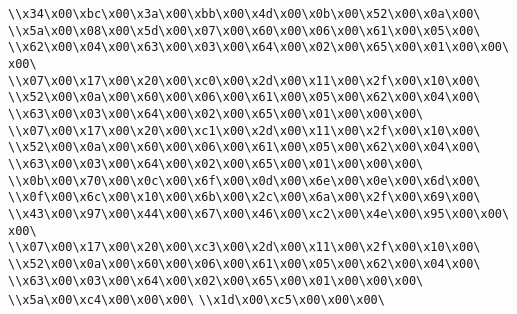 \verb|\\x34\x00\xbc\x00\x3a\x00\xbb\x00\x4d\x00\x0b\x00\x52\x00\x0a\x00\|\newline
\verb|\\x5a\x00\x08\x00\x5d\x00\x07\x00\x60\x00\x06\x00\x61\x00\x05\x00\|\newline
\verb|\\x62\x00\x04\x00\x63\x00\x03\x00\x64\x00\x02\x00\x65\x00\x01\x00\x00\x00\|\newline
\verb|\\x07\x00\x17\x00\x20\x00\xc0\x00\x2d\x00\x11\x00\x2f\x00\x10\x00\|\newline
\verb|\\x52\x00\x0a\x00\x60\x00\x06\x00\x61\x00\x05\x00\x62\x00\x04\x00\|\newline
\verb|\\x63\x00\x03\x00\x64\x00\x02\x00\x65\x00\x01\x00\x00\x00\|\newline
\verb|\\x07\x00\x17\x00\x20\x00\xc1\x00\x2d\x00\x11\x00\x2f\x00\x10\x00\|\newline
\verb|\\x52\x00\x0a\x00\x60\x00\x06\x00\x61\x00\x05\x00\x62\x00\x04\x00\|\newline
\verb|\\x63\x00\x03\x00\x64\x00\x02\x00\x65\x00\x01\x00\x00\x00\|\newline
\verb|\\x0b\x00\x70\x00\x0c\x00\x6f\x00\x0d\x00\x6e\x00\x0e\x00\x6d\x00\|\newline
\verb|\\x0f\x00\x6c\x00\x10\x00\x6b\x00\x2c\x00\x6a\x00\x2f\x00\x69\x00\|\newline
\verb|\\x43\x00\x97\x00\x44\x00\x67\x00\x46\x00\xc2\x00\x4e\x00\x95\x00\x00\x00\|\newline
\verb|\\x07\x00\x17\x00\x20\x00\xc3\x00\x2d\x00\x11\x00\x2f\x00\x10\x00\|\newline
\verb|\\x52\x00\x0a\x00\x60\x00\x06\x00\x61\x00\x05\x00\x62\x00\x04\x00\|\newline
\verb|\\x63\x00\x03\x00\x64\x00\x02\x00\x65\x00\x01\x00\x00\x00\|\newline
\verb|\\x5a\x00\xc4\x00\x00\x00\|\newline
\verb|\\x1d\x00\xc5\x00\x00\x00\|\newline
